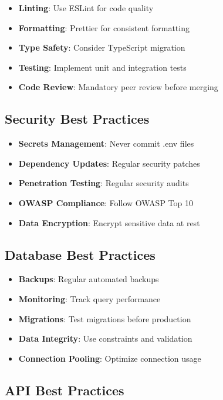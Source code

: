 \documentclass[12pt,a4paper]{report}
\begin{document}
\begin{itemize}
    \item \textbf{Linting}: Use ESLint for code quality
    \item \textbf{Formatting}: Prettier for consistent formatting
    \item \textbf{Type Safety}: Consider TypeScript migration
    \item \textbf{Testing}: Implement unit and integration tests
    \item \textbf{Code Review}: Mandatory peer review before merging
\end{itemize}

\subsection{Security Best Practices}

\begin{itemize}
    \item \textbf{Secrets Management}: Never commit .env files
    \item \textbf{Dependency Updates}: Regular security patches
    \item \textbf{Penetration Testing}: Regular security audits
    \item \textbf{OWASP Compliance}: Follow OWASP Top 10
    \item \textbf{Data Encryption}: Encrypt sensitive data at rest
\end{itemize}

\subsection{Database Best Practices}

\begin{itemize}
    \item \textbf{Backups}: Regular automated backups
    \item \textbf{Monitoring}: Track query performance
    \item \textbf{Migrations}: Test migrations before production
    \item \textbf{Data Integrity}: Use constraints and validation
    \item \textbf{Connection Pooling}: Optimize connection usage
\end{itemize}

\subsection{API Best Practices}
\end{document}
